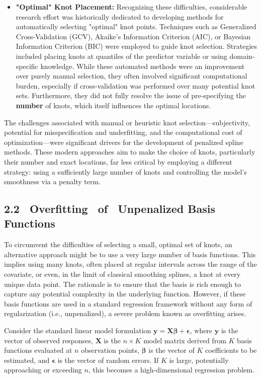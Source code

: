 \documentclass[11pt, a4paper]{article}
\begin{document}
\begin{itemize}
 \item \textbf{"Optimal" Knot Placement:} Recognizing these difficulties, considerable research effort was historically dedicated to developing methods for automatically selecting "optimal" knot points. Techniques such as Generalized Cross-Validation (GCV), Akaike's Information Criterion (AIC), or Bayesian Information Criterion (BIC) were employed to guide knot selection. Strategies included placing knots at quantiles of the predictor variable or using domain-specific knowledge. While these automated methods were an improvement over purely manual selection, they often involved significant computational burden, especially if cross-validation was performed over many potential knot sets. Furthermore, they did not fully resolve the issue of pre-specifying the \textbf{number} of knots, which itself influences the optimal locations. 
\end{itemize}
The challenges associated with manual or heuristic knot selection—subjectivity, potential for misspecification and underfitting, and the computational cost of optimization—were significant drivers for the development of penalized spline methods. These modern approaches aim to make the choice of knots, particularly their number and exact locations, far less critical by employing a different strategy: using a sufficiently large number of knots and controlling the model's smoothness via a penalty term.

\subsection{2.2  Overfitting  of  Unpenalized Basis Functions}
To circumvent the difficulties of selecting a small, optimal set of knots, an alternative approach might be to use a very large number of basis functions. This implies using many knots, often placed at regular intervals across the range of the covariate, or even, in the limit of classical smoothing splines, a knot at every unique data point. The rationale is to ensure that the basis is rich enough to capture any potential complexity in the underlying function. However, if these basis functions are used in a standard regression framework without any form of regularization (i.e., unpenalized), a severe problem known as overfitting arises.

Consider the standard linear model formulation $\mathbf{y} = \mathbf{X}\boldsymbol{\beta} + \boldsymbol{\epsilon}$, where $\mathbf{y}$ is the vector of observed responses, $\mathbf{X}$ is the $n \times K$ model matrix derived from $K$ basis functions evaluated at $n$ observation points, $\boldsymbol{\beta}$ is the vector of $K$ coefficients to be estimated, and $\boldsymbol{\epsilon}$ is the vector of random errors. If $K$ is large, potentially approaching or exceeding $n$, this becomes a high-dimensional regression problem.
\end{document}
